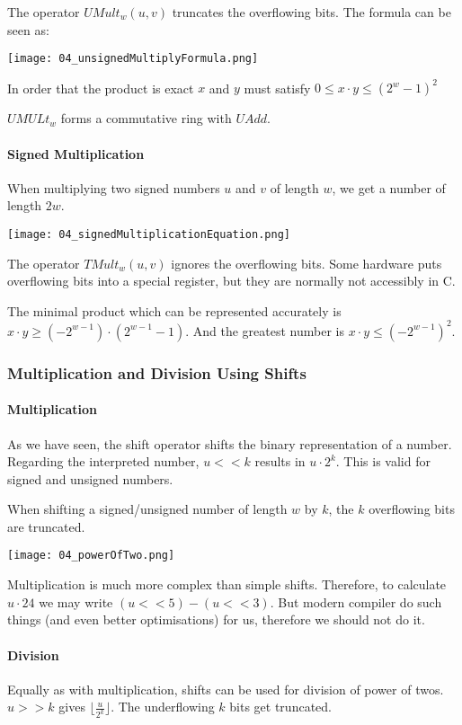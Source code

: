 The operator $UMult_w(u,v)$ truncates the overflowing bits. The formula can be seen as:

\texttt{[image: 04\_unsignedMultiplyFormula.png]}

In order that the product is exact $x$ and $y$ must satisfy $0 \le x \cdot y \le (2^w -1)^2$

$UMULt_w$ forms a commutative ring with $UAdd$.

\paragraph{Signed Multiplication}
When multiplying two signed numbers $u$ and $v$ of length $w$, we get a number of length $2w$.

\texttt{[image: 04\_signedMultiplicationEquation.png]}

The operator $TMult_w(u,v)$ ignores the overflowing bits. Some hardware puts overflowing bits into a special register, but they are normally not accessibly in C.

The minimal product which can be represented accurately is $x \cdot y \ge (-2^{w - 1}) \cdot (2^{w - 1} - 1)$. And the greatest number is $x \cdot y \le (-2^{w -1})^2$.

\subsubsection{Multiplication and Division Using Shifts}
\paragraph{Multiplication}
As we have seen, the shift operator shifts the binary representation of a number. Regarding the interpreted number, $u << k$ results in $u \cdot 2^k$. This is valid for signed and unsigned numbers.

When shifting a signed/unsigned number of length $w$ by $k$, the $k$ overflowing bits are truncated.

\texttt{[image: 04\_powerOfTwo.png]}

Multiplication is much more complex than simple shifts. Therefore, to calculate $u \cdot 24$ we may write $(u << 5) - (u << 3)$. But modern compiler do such things (and even better optimisations) for us, therefore we should not do it.

\paragraph{Division}
Equally as with multiplication, shifts can be used for division of power of twos. $u >> k$ gives $\lfloor \frac{u}{2^k} \rfloor$. The underflowing $k$ bits get truncated.

